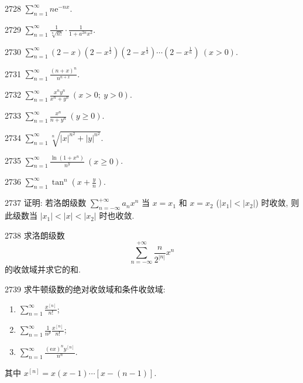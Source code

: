 \begin{prob}[S]{2728}
$\sum_{n=1}^{\infty} n\mathrm{e}^{-nx}$.
\end{prob}

\begin{prob}[S]{2729}
$\sum_{n=1}^{\infty} \frac{1}{\sqrt[n]{n!}}\cdot \frac{1}{1+a^{2n}x^2}$.
\end{prob}

\begin{prob}[S]{2730}
$\sum_{n=1}^{\infty} (2-x)(2-x^{\frac{1}{2}})(2-x^{\frac{1}{3}})\cdots (2-x^{\frac{1}{n}}) \ (x > 0)$.
\end{prob}

\begin{prob}[S]{2731}
$\sum_{n=1}^{\infty} \frac{(n+x)^n}{n^{n+x}}$.
\end{prob}

\begin{prob}[S]{2732}
$\sum_{n=1}^{\infty} \frac{x^n y^n}{x^n+y^n} \ (x > 0;\ y > 0)$.
\end{prob}

\begin{prob}[S]{2733}
$\sum_{n=1}^{\infty} \frac{x^n}{n+y^n} \ (y \geqslant 0)$.
\end{prob}

\begin{prob}[S]{2734}
$\sum_{n=1}^{\infty} \sqrt[n]{|x|^{n^2}+|y|^{n^2}}$.
\end{prob}

\begin{prob}[S]{2735}
$\sum_{n=1}^{\infty} \frac{\ln(1+x^n)}{n^y} \ (x \geqslant 0)$.
\end{prob}

\begin{prob}[S]{2736}
$\sum_{n=1}^{\infty} \tan^n\left(x+\frac{y}{n}\right)$.
\end{prob}

\begin{prob}[M]{2737}
证明: 若洛朗级数 $\sum_{n=-\infty}^{+\infty} a_n x^n$ 当 $x=x_1$ 和 $x=x_2$ ($|x_1| < |x_2|$) 时收敛, 则此级数当 $|x_1| < |x| < |x_2|$ 时也收敛.
\end{prob}

\begin{prob}[M]{2738}
求洛朗级数
\[
\sum_{n=-\infty}^{+\infty} \frac{n}{2^{|n|}} x^n
\]
的收敛域并求它的和.
\end{prob}

\begin{prob}[L]{2739}
求牛顿级数的绝对收敛域和条件收敛域:
\begin{enumerate}[label=(\alph*), itemsep=2pt, topsep=3pt]
\item $\sum_{n=1}^{\infty} \frac{x^{[n]}}{n!}$;
\item $\sum_{n=1}^{\infty} \frac{1}{n^p}\frac{x^{[n]}}{n!}$;
\item $\sum_{n=1}^{\infty} \frac{(\mathrm{e}x)^n y^{[n]}}{n^n}$.
\end{enumerate}
其中 $x^{[n]} = x(x-1)\cdots [x-(n-1)]$.
\end{prob}

